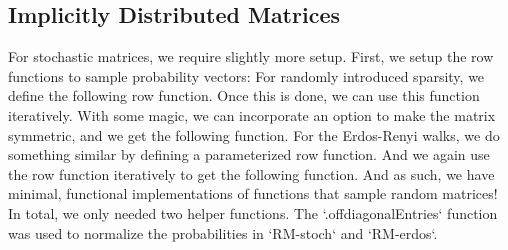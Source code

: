 \newpage
\subsection{Implicitly Distributed Matrices}


 For stochastic matrices, we require slightly more setup. First, we setup the row functions to sample probability vectors:
\trim
\trimm
For randomly introduced sparsity, we define the following row function.
\trim
\trimm
Once this is done, we can use this function iteratively. With some magic, we can incorporate an option to make the matrix symmetric, and we get the following function.
\trimm
\newpage
{} For the Erdos-Renyi walks, we do something similar by defining a parameterized row function.
\trim
\trimm
And we again use the row function iteratively to get the following function.
\trim
\trimm
And as such, we have minimal, functional implementations of functions that sample random matrices! In total, we only needed two helper functions. The `.offdiagonalEntries` function was used to normalize the probabilities in `RM-stoch` and `RM-erdos`.
\newpage
